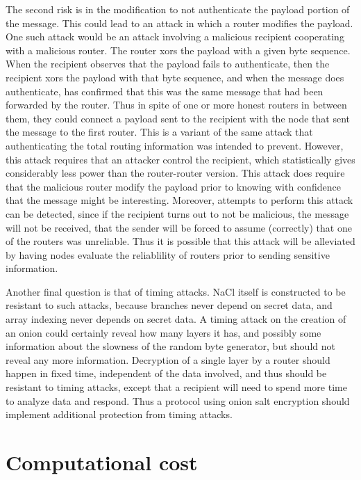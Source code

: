 \documentclass[letterpaper,twocolumn,amsmath,amssymb,pre,aps,10pt]{revtex4-1}
\begin{document}
The second risk is in the modification to not authenticate the payload
portion of the message.  This could lead to an attack in which a
router modifies the payload.  One such attack would be an attack
involving a malicious recipient cooperating with a malicious router.
The router xors the payload with a given byte sequence.  When the
recipient observes that the payload fails to authenticate, then the
recipient xors the payload with that byte sequence, and when the
message does authenticate, has confirmed that this was the same
message that had been forwarded by the router.  Thus in spite of one
or more honest routers in between them, they could connect a payload
sent to the recipient with the node that sent the message to the first
router.  This is a variant of the same attack that authenticating the
total routing information was intended to prevent.  However, this
attack requires that an attacker control the recipient, which
statistically gives considerably less power than the router-router
version.  This attack does require that the malicious router modify
the payload prior to knowing with confidence that the message might be
interesting.  Moreover, attempts to perform this attack can be
detected, since if the recipient turns out to not be malicious, the
message will not be received, that the sender will be forced to assume
(correctly) that one of the routers was unreliable.  Thus it is
possible that this attack will be alleviated by having nodes evaluate
the reliablility of routers prior to sending sensitive information.

Another final question is that of timing attacks.  NaCl itself is
constructed to be resistant to such attacks, because branches never
depend on secret data, and array indexing never depends on secret
data.  A timing attack on the creation of an onion could certainly
reveal how many layers it has, and possibly some information about the
slowness of the random byte generator, but should not reveal any more
information.  Decryption of a single layer by a router should happen
in fixed time, independent of the data involved, and thus should be
resistant to timing attacks, except that a recipient will need to
spend more time to analyze data and respond.  Thus a protocol using
onion salt encryption should implement additional protection from
timing attacks.

\section{Computational cost}
\end{document}
